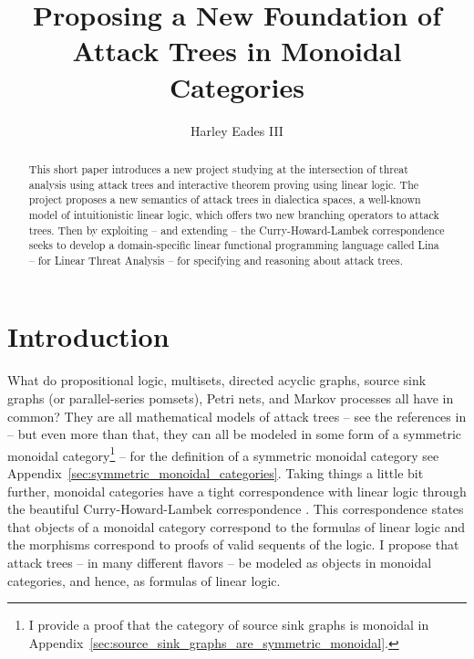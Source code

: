 \documentclass{llncs}
\date{}
\begin{document}
\title{Proposing a New Foundation of Attack Trees in Monoidal Categories}

\author{Harley Eades III}

\maketitle 

\begin{abstract}
  This short paper introduces a new project studying at the
  intersection of threat analysis using attack trees and interactive
  theorem proving using linear logic.  The project proposes a new
  semantics of attack trees in dialectica spaces, a well-known model
  of intuitionistic linear logic, which offers two new branching
  operators to attack trees.  Then by exploiting -- and extending --
  the Curry-Howard-Lambek correspondence seeks to develop a
  domain-specific linear functional programming language called Lina
  -- for Linear Threat Analysis -- for specifying and reasoning about
  attack trees.
\end{abstract}

\section{Introduction}
\label{sec:introduction}

What do propositional logic, multisets, directed acyclic graphs,
source sink graphs (or parallel-series pomsets), Petri nets, and
Markov processes all have in common?  They are all mathematical models
of attack trees -- see the references in
\cite{Kordy:2014a,Jhawar:2015} -- but even more than that, they can
all be modeled in some form of a symmetric monoidal
category\footnote{I provide a proof that the category of source sink
  graphs is monoidal in
  Appendix~\ref{sec:source_sink_graphs_are_symmetric_monoidal}.}
\cite{Tzouvaras:1998,Brown:1991,Fiore:2013,FrancescoAlbasini2010} --
for the definition of a symmetric monoidal category see
Appendix~\ref{sec:symmetric_monoidal_categories}.  Taking things a
little bit further, monoidal categories have a tight correspondence
with linear logic through the beautiful Curry-Howard-Lambek
correspondence \cite{MSC:4439568}.  This correspondence states that
objects of a monoidal category correspond to the formulas of linear
logic and the morphisms correspond to proofs of valid sequents of the
logic.  I propose that attack trees -- in many different flavors -- be
modeled as objects in monoidal categories, and hence, as formulas of
linear logic.
\end{document}

